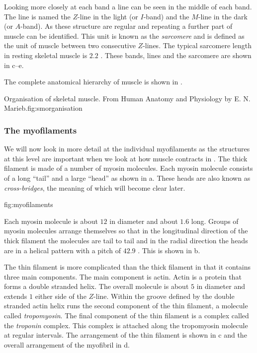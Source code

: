 Looking more closely at each band a line can be seen in the middle of
each band. The line is named the $Z$-line in the light (or $I$-band) and the
$M$-line in the dark (or $A$-band). As these structure are regular and
repeating a further part of muscle can be identified. This unit is known as
the \emph{sarcomere} and is defined as the unit of muscle between two
consecutive $Z$-lines. The typical sarcomere length in resting skeletal muscle
is $2.2$ \um. These bands, lines and the sarcomere are shown in
c--e.

The complete anatomical hierarchy of muscle is shown in
.

{Organisation of skeletal muscle. From Human Anatomy and Physiology by E. N.
  Marieb.}{fig:smorganisation}

\subsubsection{The myofilaments}

We will now look in more detail at the individual myofilaments as the
structures at this level are important when we look at how muscle contracts in
. The thick filament is made of a number of
myosin molecules. Each myosin molecule consists of a long ``tail'' and a large
``head'' as shown in a. These heads are also known as
\emph{cross-bridges}, the meaning of which will become clear later.

{fig:myofilaments}


Each myosin molecule is about $12$ \nm in diameter and about $1.6$ \um long.
Groups of myosin molecules arrange themselves so that in the longitudinal
direction of the thick filament the molecules are tail to tail and in the
radial direction the heads are in a helical pattern with a pitch of $42.9$ \nm.
This is shown in b.

The thin filament is more complicated than the thick filament in that it
contains three main components. The main component is actin. Actin is a
protein that forms a double stranded helix. The overall molecule is about $5$
\nm in diameter and extends $1$ \um either side of the $Z$-line. Within the
groove defined by the double stranded actin helix runs the second component of
the thin filament, a molecule called \emph{tropomyosin}. The final component
of the thin filament is a complex called the \emph{troponin} complex. This
complex is attached along the tropomyosin molecule at regular intervals. The
arrangement of the thin filament is shown in c and
the overall arrangement of the myofibril in d.

